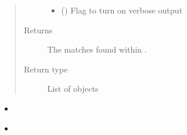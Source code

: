 \documentclass[letterpaper,10pt,english]{sphinxmanual}
\begin{document}
\begin{fulllineitems}
\begin{quote}
\begin{description}
\begin{itemize}
\item {} 
 (\sphinxstyleliteralemphasis{\sphinxupquote{, }}\sphinxstyleliteralemphasis{\sphinxupquote{, }}) \textendash{} Flag to turn on verbose output

\end{itemize}

\item[{Returns}] \leavevmode
{} \textendash{} The matches found within .

\item[{Return type}] \leavevmode
List of {\hyperref[\detokenize{classes:pyresid.MatchClass}]{}} objects

\end{description}\end{quote}



\begin{itemize}
\item {} 
{\hyperref[\detokenize{functions:pyresid.identify_residues}]{}}

\item {} 
{\hyperref[\detokenize{functions:pyresid.load_protein_IDs}]{}}

\end{itemize}



\end{fulllineitems}

\end{document}
